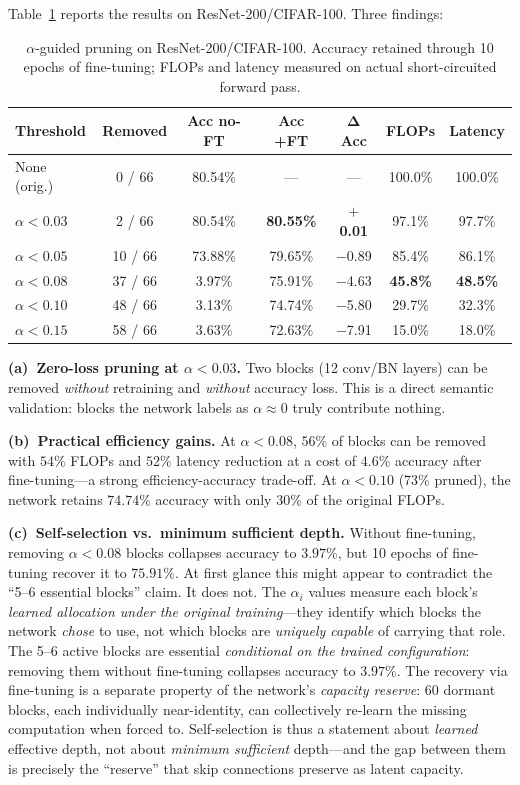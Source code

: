\documentclass{bmvc2k}
\begin{document}
Table~\ref{tab:pruning} reports the results on ResNet-200/CIFAR-100. Three findings:

\begin{table}[!ht]
\centering
\small
\caption{$\alpha$-guided pruning on ResNet-200/CIFAR-100. Accuracy retained through 10 epochs of fine-tuning; FLOPs and latency measured on actual short-circuited forward pass.}
\label{tab:pruning}
\begin{tabular}{lcccccc}
\toprule
\textbf{Threshold} & \textbf{Removed} & \textbf{Acc no-FT} & \textbf{Acc +FT} & $\mathbf{\Delta}$\textbf{Acc} & \textbf{FLOPs} & \textbf{Latency} \\
\midrule
None (orig.) & 0 / 66 & 80.54\% & --- & --- & 100.0\% & 100.0\% \\
$\alpha < 0.03$ & 2 / 66 & 80.54\% & \textbf{80.55\%} & \textbf{$+$0.01} & 97.1\% & 97.7\% \\
$\alpha < 0.05$ & 10 / 66 & 73.88\% & 79.65\% & $-$0.89 & 85.4\% & 86.1\% \\
$\alpha < 0.08$ & 37 / 66 & 3.97\% & 75.91\% & $-$4.63 & \textbf{45.8\%} & \textbf{48.5\%} \\
$\alpha < 0.10$ & 48 / 66 & 3.13\% & 74.74\% & $-$5.80 & 29.7\% & 32.3\% \\
$\alpha < 0.15$ & 58 / 66 & 3.63\% & 72.63\% & $-$7.91 & 15.0\% & 18.0\% \\
\bottomrule
\end{tabular}
\end{table}

\textbf{(a)~Zero-loss pruning at $\alpha < 0.03$.} Two blocks (12 conv/BN layers) can be removed \emph{without} retraining and \emph{without} accuracy loss. This is a direct semantic validation: blocks the network labels as $\alpha \approx 0$ truly contribute nothing.

\textbf{(b)~Practical efficiency gains.} At $\alpha < 0.08$, $56\%$ of blocks can be removed with $54\%$ FLOPs and $52\%$ latency reduction at a cost of $4.6\%$ accuracy after fine-tuning---a strong efficiency-accuracy trade-off. At $\alpha < 0.10$ (73\% pruned), the network retains $74.74\%$ accuracy with only $30\%$ of the original FLOPs.

\textbf{(c)~Self-selection vs.\ minimum sufficient depth.} Without fine-tuning, removing $\alpha < 0.08$ blocks collapses accuracy to $3.97\%$, but 10 epochs of fine-tuning recover it to $75.91\%$. At first glance this might appear to contradict the ``5--6 essential blocks'' claim. It does not. The $\alpha_i$ values measure each block's \emph{learned allocation under the original training}---they identify which blocks the network \emph{chose} to use, not which blocks are \emph{uniquely capable} of carrying that role. The 5--6 active blocks are essential \emph{conditional on the trained configuration}: removing them without fine-tuning collapses accuracy to $3.97\%$. The recovery via fine-tuning is a separate property of the network's \emph{capacity reserve}: 60 dormant blocks, each individually near-identity, can collectively re-learn the missing computation when forced to. Self-selection is thus a statement about \emph{learned} effective depth, not about \emph{minimum sufficient} depth---and the gap between them is precisely the ``reserve'' that skip connections preserve as latent capacity.
\end{document}

